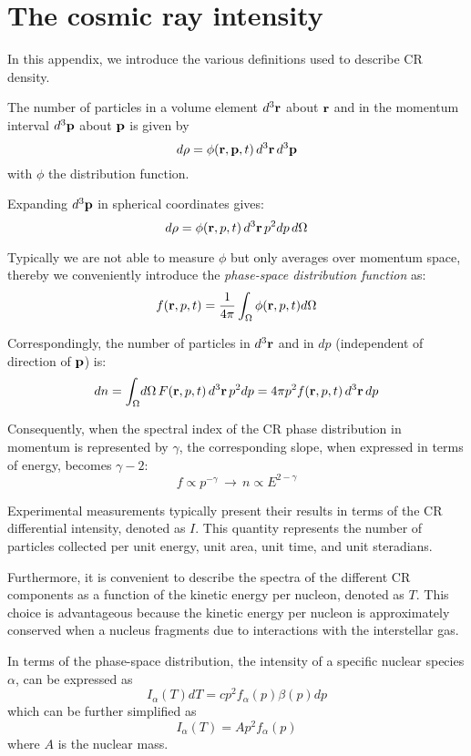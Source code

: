 \section{The cosmic ray intensity}
\label{app:intensity}

In this appendix, we introduce the various definitions used to describe CR density. 

The number of particles in a volume element $d^3 \vb{r}$ about $\vb r$ and in the momentum interval $d^3 \vb p$ about $\vb p$ is given by
%
\begin{equation}
d\rho = \phi(\vb r, \vb p, t) \, d^3 \vb r \, d^3 \vb p
\end{equation}
%
with $\phi$ the distribution function.

Expanding $d^3 \vb p$ in spherical coordinates gives:
%
\begin{equation}
d\rho  = \phi(\vb r, p, t) \, d^3 \vb r \, p^2 dp \, d\Omega
\end{equation}

Typically we are not able to measure $\phi$ but only averages over momentum space, thereby we conveniently introduce the \emph{phase-space distribution function} as:
%
\begin{equation}
f(\vb r, p, t) = \frac{1}{4\pi} \int_\Omega \phi(\vb r, p, t) d\Omega
\end{equation}

Correspondingly, the number of particles in $d^3 \vb r$ and in $dp$ (independent of direction of $\vb p$) is:
%
\begin{equation}
dn = \int_\Omega \! d\Omega \, F(\vb r, p, t) \, d^3 \vb r \, p^2 dp = 4 \pi p^2 f(\vb r, p, t) \, d^3 \vb r \, dp
\end{equation}
 
Consequently, when the spectral index of the CR phase distribution in momentum is represented by $\gamma$, the corresponding slope, when expressed in terms of energy, becomes $\gamma - 2$:
%
\begin{equation}
f \propto p^{-\gamma} \, \rightarrow \, n \propto E^{2-\gamma}
\end{equation}

Experimental measurements typically present their results in terms of the CR differential intensity, denoted as $I$. This quantity represents the number of particles collected per unit energy, unit area, unit time, and unit steradians.

Furthermore, it is convenient to describe the spectra of the different CR components as a function of the kinetic energy per nucleon, denoted as $T$. This choice is advantageous because the kinetic energy per nucleon is approximately conserved when a nucleus fragments due to interactions with the interstellar gas.

In terms of the phase-space distribution, the intensity of a specific nuclear species $\alpha$, can be expressed as 
%
\begin{equation}
I_\alpha (T) dT = c p^2 f_\alpha(p) \beta (p) dp 
\end{equation}
%
which can be further simplified as 
%
\begin{equation}
I_\alpha(T) = A p^2 f_\alpha(p)
\label{eq:f2I}
\end{equation}
%
where $A$ is the nuclear mass.
